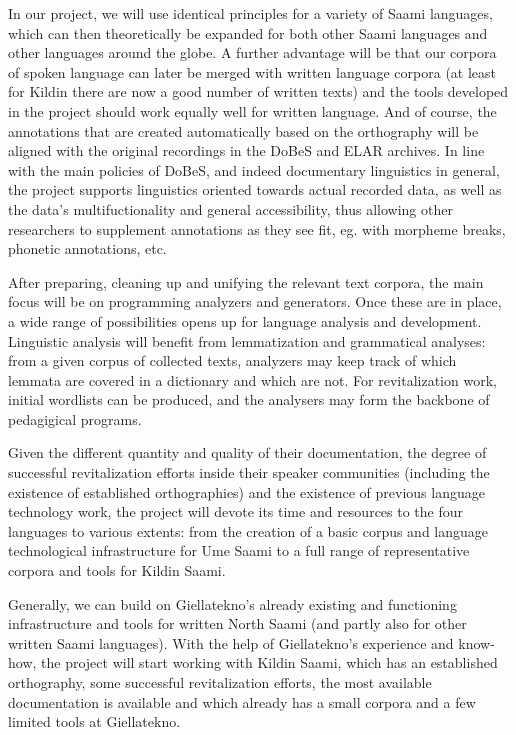 \documentclass[a4paper,12pt]{article}
\begin{document}
In our project, we will use identical principles for a variety of Saami languages, which can then theoretically be expanded for both other Saami languages and other languages around the globe. A further advantage will be that our corpora of spoken language can later be merged with written language corpora (at least for Kildin there are now a good number of written texts) and the tools developed in the project should work equally well for written language. And of course, the annotations that are created automatically based on the orthography will be aligned with the original recordings in the DoBeS and ELAR archives. In line with the main policies of DoBeS, and indeed documentary linguistics in general, the project supports linguistics oriented towards actual recorded data, as well as the data's multifuctionality and general accessibility, thus allowing other researchers to supplement annotations as they see fit, eg. with morpheme breaks, phonetic annotations, etc.

After preparing, cleaning up and unifying the relevant text corpora, the main focus will be on programming analyzers and generators. Once these are in place, a wide range of possibilities opens up for language analysis and development. Linguistic analysis will benefit from lemmatization and grammatical analyses: from a given corpus of collected texts, analyzers may keep track of which lemmata are covered in a dictionary and which are not. For revitalization work, initial wordlists can be produced, and the analysers may form the backbone of pedagigical programs. %

Given the different quantity and quality of their documentation, the degree of successful revitalization efforts inside their speaker communities (including the existence of established orthographies) and the existence of previous language technology work, the project will devote its time and resources to the four languages to various extents: from the creation of a basic corpus and language technological infrastructure for Ume Saami to a full range of representative corpora and tools for Kildin Saami.

Generally, we can build on Giellatekno's already existing and functioning infrastructure and tools for written North Saami (and partly also for other written Saami languages). With the help of Giellatekno's experience and know-how, the project will start working with Kildin Saami, which has an established orthography, some successful revitalization efforts, the most available documentation is available and which already has a small corpora and a few limited tools at Giellatekno.
\end{document}
